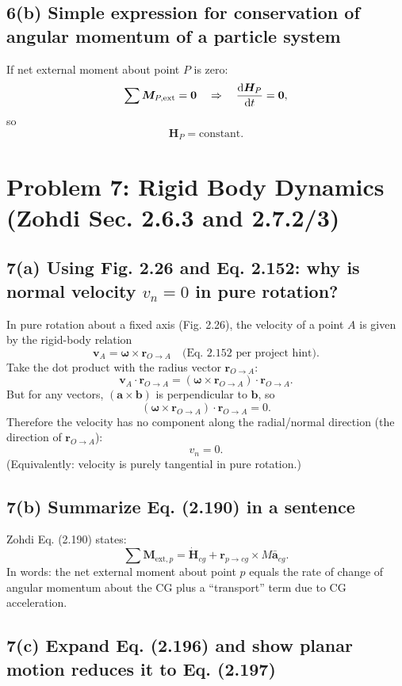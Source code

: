 \documentclass[12pt]{article}
\begin{document}
\subsection*{6(b) Simple expression for conservation of angular momentum of a particle system}

If net external moment about point $P$ is zero:
\[
\sum \bm M_{P,\text{ext}} = \bm 0 \quad \Rightarrow \quad \dv{\bm H_P}{t}=\bm 0,
\]
so
\[
\boxed{\bm H_P = \text{constant}.}
\]

\newpage
\section*{Problem 7: Rigid Body Dynamics (Zohdi Sec. 2.6.3 and 2.7.2/3)}

\subsection*{7(a) Using Fig. 2.26 and Eq. 2.152: why is normal velocity $v_n=0$ in pure rotation?}

In pure rotation about a fixed axis (Fig. 2.26), the velocity of a point $A$ is given by the rigid-body relation
\[
\bm v_A = \bm\omega \times \bm r_{O\to A}
\quad \text{(Eq. 2.152 per project hint).}
\]
Take the dot product with the radius vector $\bm r_{O\to A}$:
\[
\bm v_A\cdot \bm r_{O\to A}
= (\bm\omega\times \bm r_{O\to A})\cdot \bm r_{O\to A}.
\]
But for any vectors, $(\bm a\times \bm b)$ is perpendicular to $\bm b$, so
\[
(\bm\omega\times \bm r_{O\to A})\cdot \bm r_{O\to A}=0.
\]
Therefore the velocity has no component along the radial/normal direction (the direction of $\bm r_{O\to A}$):
\[
\boxed{v_n = 0.}
\]
(Equivalently: velocity is purely tangential in pure rotation.)

\subsection*{7(b) Summarize Eq. (2.190) in a sentence}

Zohdi Eq. (2.190) states:
\[
\sum \bm M_{\text{ext},p} = \dot{\bm H}_{cg} + \bm r_{p\to cg}\times M\bar{\bm a}_{cg}.
\]
In words: the net external moment about point $p$ equals the rate of change of angular momentum about the CG plus a “transport” term due to CG acceleration.

\newpage
\subsection*{7(c) Expand Eq. (2.196) and show planar motion reduces it to Eq. (2.197)}
\end{document}
